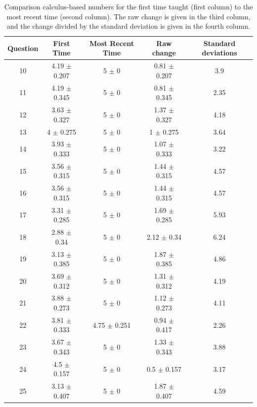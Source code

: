 \documentclass[../../main.tex]{subfiles}
\begin{document}
\begin{table}[hb]
\small
\centering
\begin{tabular}{| c | c | c | c | c |}
\hline
\hline
Question & First Time & Most Recent Time & Raw change & Standard deviations \\
\hline
10 & 4.19 $\pm$ 0.207 & 5 $\pm$ 0 & 0.81 $\pm$ 0.207 & 3.9 \\ \hline
11 & 4.19 $\pm$ 0.345 & 5 $\pm$ 0 & 0.81 $\pm$ 0.345 & 2.35 \\ \hline
12 & 3.63 $\pm$ 0.327 & 5 $\pm$ 0 & 1.37 $\pm$ 0.327 & 4.18 \\ \hline
13 & 4 $\pm$ 0.275 & 5 $\pm$ 0 & 1 $\pm$ 0.275 & 3.64 \\ \hline
14 & 3.93 $\pm$ 0.333 & 5 $\pm$ 0 & 1.07 $\pm$ 0.333 & 3.22 \\ \hline
15 & 3.56 $\pm$ 0.315 & 5 $\pm$ 0 & 1.44 $\pm$ 0.315 & 4.57 \\ \hline
16 & 3.56 $\pm$ 0.315 & 5 $\pm$ 0 & 1.44 $\pm$ 0.315 & 4.57 \\ \hline
17 & 3.31 $\pm$ 0.285 & 5 $\pm$ 0 & 1.69 $\pm$ 0.285 & 5.93 \\ \hline
18 & 2.88 $\pm$ 0.34 & 5 $\pm$ 0 & 2.12 $\pm$ 0.34 & 6.24 \\ \hline
19 & 3.13 $\pm$ 0.385 & 5 $\pm$ 0 & 1.87 $\pm$ 0.385 & 4.86 \\ \hline
20 & 3.69 $\pm$ 0.312 & 5 $\pm$ 0 & 1.31 $\pm$ 0.312 & 4.19 \\ \hline
21 & 3.88 $\pm$ 0.273 & 5 $\pm$ 0 & 1.12 $\pm$ 0.273 & 4.11 \\ \hline
22 & 3.81 $\pm$ 0.333 & 4.75 $\pm$ 0.251 & 0.94 $\pm$ 0.417 & 2.26 \\ \hline
23 & 3.67 $\pm$ 0.343 & 5 $\pm$ 0 & 1.33 $\pm$ 0.343 & 3.88 \\ \hline
24 & 4.5 $\pm$ 0.157 & 5 $\pm$ 0 & 0.5 $\pm$ 0.157 & 3.17 \\ \hline
25 & 3.13 $\pm$ 0.407 & 5 $\pm$ 0 & 1.87 $\pm$ 0.407 & 4.59 \\ \hline
\hline
\end{tabular}
\caption{\label{tab:courses:intro_shifts_2} Comparison calculus-based numbers for the first time taught (first column) to the most recent time (second column). The raw change is given in the third column, and the change divided by the standard deviation is given in the fourth column.}
\end{table}
\end{document}
